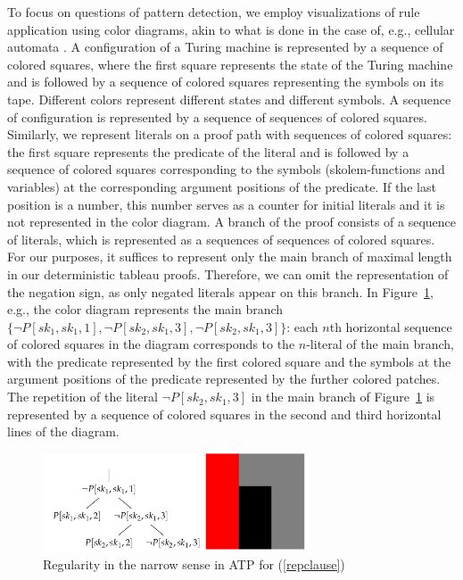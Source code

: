 \documentclass[%
  manuscript=article,   %
  year=2024,
  volume=77,
  doi=00000.000,
]{zfn}
\begin{document}
To focus on questions of pattern detection, we employ visualizations of rule application using color diagrams, akin to what is done in the case of, e.g., cellular automata \parencite[cf.][]{Wolfram}. 
A configuration of a Turing machine is represented by a sequence of colored squares, where the first square represents the state of the Turing machine and is followed by a sequence of colored squares representing the symbols on its tape. Different colors represent different states and different symbols. A sequence of configuration is represented by a sequence of sequences of colored squares. Similarly, we represent literals on a proof path with sequences of colored squares: the first square represents \label{colordia} the predicate of the literal and is followed by a sequence of colored squares corresponding to the symbols (skolem-functions and variables) at the corresponding argument positions of the predicate. If the last position is a number, this number serves as a counter for initial literals and it is not represented in the color diagram. A branch of the proof consists of a sequence of literals, which is represented as a sequences of sequences of colored squares. For our purposes, it suffices to represent only the main branch of maximal length in our deterministic tableau proofs. Therefore, we can omit the representation of the negation sign, as only negated literals appear on this branch. In Figure~\ref{rep}, e.g., the color diagram represents the main branch $\{\neg P[sk_1,sk_1,1], \neg P[sk_2,sk_1,3], \neg P[sk_2,sk_1,3]\}$: each $n$th horizontal sequence 
of colored squares in the diagram corresponds to the $n$-literal of the main branch, with the predicate represented by the first colored square and the symbols at the argument positions of the predicate represented by the further colored patches. The repetition of the literal $\neg P[sk_2,sk_1,3]$ in the main branch of Figure~\ref{rep} is represented by a sequence of colored squares in the second and third horizontal lines of the diagram.


\begin{figure}[ht]
\begin{center}
\includegraphics[width=8cm]{ART_Lampert/fig1.png}
\end{center}
\caption{Regularity in the narrow sense in ATP for (\ref{repclause})}
    \label{rep}
\end{figure}
\end{document}
